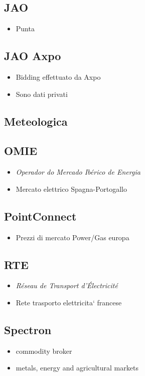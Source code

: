 \subsection{JAO}
    \begin{itemize}
        \item Punta
    \end{itemize}
\subsection{JAO Axpo}
    \begin{itemize}
        \item Bidding effettuato da Axpo
        \item Sono dati privati
    \end{itemize}
\subsection{Meteologica}
    
\subsection{OMIE}
    \begin{itemize}
        \item \textit{Operador do Mercado Ibérico de Energia}
        \item Mercato elettrico Spagna-Portogallo
    \end{itemize}
\subsection{PointConnect}
    \begin{itemize}
        \item Prezzi di mercato Power/Gas europa
    \end{itemize}
\subsection{RTE}
    \begin{itemize}
        \item \textit{Réseau de Transport d'Électricité}
        \item Rete trasporto elettricita` francese
    \end{itemize}
\subsection{Spectron} \cite{bib:spectron:url}
    \begin{itemize}
        \item commodity broker
        \item metals, energy and agricultural markets
    \end{itemize}
